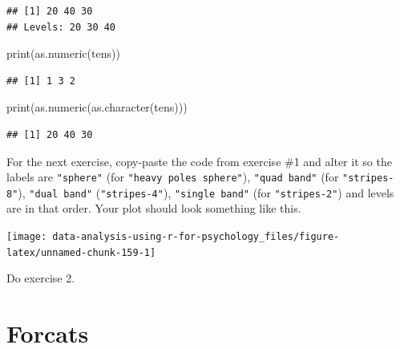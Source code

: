 \documentclass[
]{book}
\newenvironment{Shaded}{\begin{snugshade}}{\end{snugshade}}
\newcommand{\FunctionTok}[1]{\textcolor[rgb]{0.00,0.00,0.00}{#1}}
\newcommand{\NormalTok}[1]{#1}
\begin{document}
\begin{verbatim}
## [1] 20 40 30
## Levels: 20 30 40
\end{verbatim}

\begin{Shaded}
\begin{Highlighting}[]
\FunctionTok{print}\NormalTok{(}\FunctionTok{as.numeric}\NormalTok{(tens))}
\end{Highlighting}
\end{Shaded}

\begin{verbatim}
## [1] 1 3 2
\end{verbatim}

\begin{Shaded}
\begin{Highlighting}[]
\FunctionTok{print}\NormalTok{(}\FunctionTok{as.numeric}\NormalTok{(}\FunctionTok{as.character}\NormalTok{(tens)))}
\end{Highlighting}
\end{Shaded}

\begin{verbatim}
## [1] 20 40 30
\end{verbatim}

For the next exercise, copy-paste the code from exercise \#1 and alter it so the labels are \texttt{"sphere"} (for \texttt{"heavy\ poles\ sphere"}), \texttt{"quad\ band"} (for \texttt{"stripes-8"}), \texttt{"dual\ band"} (\texttt{"stripes-4"}), \texttt{"single\ band"} (for \texttt{"stripes-2"}) and levels are in that order. Your plot should look something like this.

\begin{center}\texttt{[image: data-analysis-using-r-for-psychology\_files/figure-latex/unnamed-chunk-159-1]} \end{center}

Do exercise 2.

\hypertarget{forcats}{%
\section{Forcats}\label{forcats}}
\end{document}
